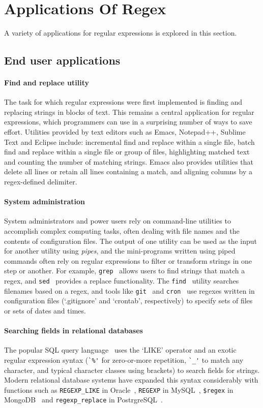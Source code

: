 \section{Applications Of Regex}
A variety of applications for regular expressions is explored in this section.

\subsection{End user applications}
\paragraph{Find and replace utility}  The task for which regular expressions were first implemented is finding and replacing strings in blocks of text.  This remains a central application for regular expressions, which programmers can use in a surprising number of ways to save effort.  Utilities provided by text editors such as Emacs, Notepad++, Sublime Text and Eclipse include: incremental find and replace within a single file, batch find and replace within a single file or group of files, highlighting matched text and counting the number of matching strings.  Emacs also provides utilities that delete all lines or retain all lines containing a match, and aligning columns by a regex-defined delimiter.

\paragraph{System administration}  System administrators and power users rely on command-line utilities to accomplish complex computing tasks, often dealing with file names and the contents of configuration files.  The output of one utility can be used as the input for another utility using \emph{pipes}, and the mini-programs written using piped commands often rely on regular expressions to filter or transform strings in one step or another.  For example, {\tt grep}~\citep{grepManual} allows users to find strings that match a regex, and {\tt sed}~\citep{sedManual} provides a replace functionality.  The {\tt find}~\citep{findManual} utility searches filenames based on a regex, and tools like {\tt git}~\citep{gitManual} and {\tt cron}~\citep{cronManual} use regexes written in configuration files (`.gitignore' and `crontab', respectively) to specify sets of files or sets of dates and times.

\paragraph{Searching fields in relational databases}  The popular SQL query language~\cite{Chamberlin:1974:SSE:800296.811515} uses the `LIKE' operator and an exotic regular expression syntax (\verb!`%'! for zero-or-more repetition, \verb!`_'! to match any character, and typical character classes using brackets) to search fields for strings.  Modern relational database systems have expanded this syntax considerably with functions such as {\tt REGEXP\_LIKE} in Oracle~\citep{OracleRegexpLike}, {\tt REGEXP} in MySQL~\citep{MySQLRegexp}, {\tt\$regex} in MongoDB~\citep{MongoDBregex} and {\tt regexp\_replace} in PostrgreSQL~\citep{PostgreSQLregexreplace}.


